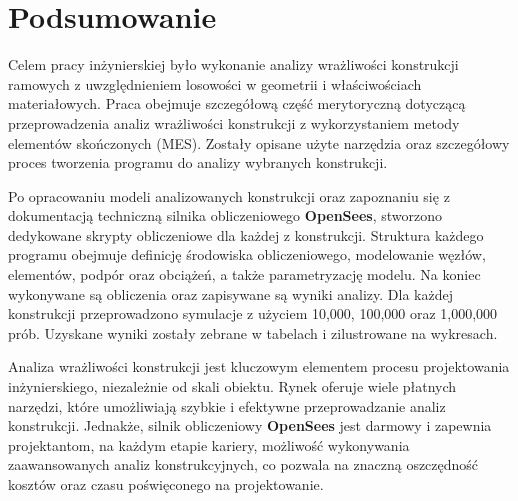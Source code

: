 \newpage
\section{Podsumowanie}

Celem pracy inżynierskiej było wykonanie analizy wrażliwości konstrukcji ramowych z uwzględnieniem losowości w geometrii i właściwościach materiałowych.
Praca obejmuje szczegółową część merytoryczną dotyczącą przeprowadzenia analiz wrażliwości konstrukcji z wykorzystaniem metody elementów skończonych (MES).
Zostały opisane użyte narzędzia oraz szczegółowy proces tworzenia programu do analizy wybranych konstrukcji.

Po opracowaniu modeli analizowanych konstrukcji oraz zapoznaniu się z dokumentacją techniczną silnika obliczeniowego \textbf{OpenSees}, stworzono dedykowane skrypty obliczeniowe dla każdej z konstrukcji.
Struktura każdego programu obejmuje definicję środowiska obliczeniowego, modelowanie węzłów, elementów, podpór oraz obciążeń, a także parametryzację modelu.
Na koniec wykonywane są obliczenia oraz zapisywane są wyniki analizy.
Dla każdej konstrukcji przeprowadzono symulacje z użyciem 10,000, 100,000 oraz 1,000,000 prób.
Uzyskane wyniki zostały zebrane w tabelach i zilustrowane na wykresach.

Analiza wrażliwości konstrukcji jest kluczowym elementem procesu projektowania inżynierskiego, niezależnie od skali obiektu.
Rynek oferuje wiele płatnych narzędzi, które umożliwiają szybkie i efektywne przeprowadzanie analiz konstrukcji.
Jednakże, silnik obliczeniowy \textbf{OpenSees} jest darmowy i zapewnia projektantom, na każdym etapie kariery, możliwość wykonywania zaawansowanych analiz konstrukcyjnych, co pozwala na znaczną oszczędność kosztów oraz czasu poświęconego na projektowanie.


